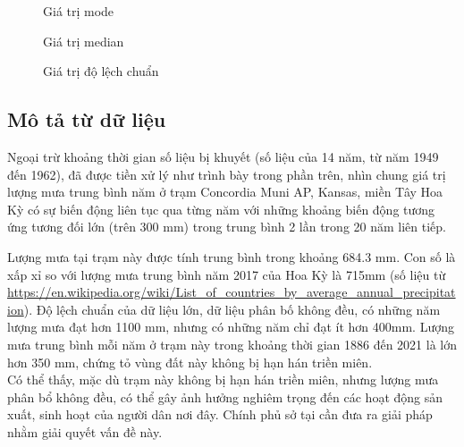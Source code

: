\documentclass[a4paper]{article}
\begin{document}
\begin{center}
\begin{figure}[H]
\caption{Giá trị mode}
\end{figure}

\begin{figure}[H]
\caption{Giá trị median}
\end{figure}

\begin{figure}[H]
\caption{Giá trị độ lệch chuẩn}
\end{figure}
\end{center}
\subsection{Mô tả từ dữ liệu}
Ngoại trừ khoảng thời gian số liệu bị khuyết (số liệu của 14 năm, từ năm 1949 đến 1962), đã được tiền xử lý như trình bày trong phần trên, nhìn chung giá trị lượng mưa trung bình năm ở trạm Concordia Muni AP, Kansas, miền Tây Hoa Kỳ có sự biến động liên tục qua từng năm với những khoảng biến động tương ứng tương đối lớn (trên 300 mm) trong trung bình 2 lần trong 20 năm liên tiếp. 

Lượng mưa tại trạm này được tính trung bình trong khoảng 684.3 mm. Con số là xấp xỉ so với lượng mưa trung bình năm 2017 của Hoa Kỳ là 715mm (số liệu từ \url{https://en.wikipedia.org/wiki/List_of_countries_by_average_annual_precipitation}). Độ lệch chuẩn của dữ liệu lớn, dữ liệu phân bố không đều, có những năm lượng mưa đạt hơn 1100 mm, nhưng có những năm chỉ đạt ít hơn 400mm. Lượng mưa trung bình mỗi năm ở trạm này trong khoảng thời gian 1886 đến 2021 là lớn hơn 350 mm, chứng tỏ vùng đất này không bị hạn hán triền miên.\\
Có thể thấy, mặc dù trạm này không bị hạn hán triền miên, nhưng lượng mưa phân bổ không đều, có thể gây ảnh hưởng nghiêm trọng đến các hoạt động sản xuất, sinh hoạt của người dân nơi đây. Chính phủ sở tại cần đưa ra giải pháp nhằm giải quyết vấn đề này.
\end{document}
